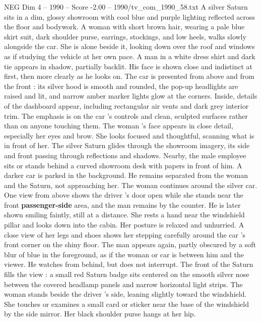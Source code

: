 \begin{textsample}{NEG Dim 4 – 1990 – Score -2.00 – 1990/tv\_com\_1990\_58.txt}  \label{ex:f4_neg_022}
A silver Saturn sits in a dim, glossy showroom with cool blue and purple lighting reflected across the floor and bodywork.
A woman with short brown hair, wearing a pale blue skirt suit, dark shoulder purse, earrings, stockings, and low heels, walks slowly alongside the car.
She is alone beside it, looking down over the roof and windows as if studying the vehicle at her own pace.
A man in a white dress shirt and dark tie appears in shadow, partially backlit.
His face is shown close and indistinct at first, then more clearly as he looks on.
The car is presented from above and from the front : its silver hood is smooth and rounded, the pop-up headlights are raised and lit, and narrow amber marker lights glow at the corners.
Inside, details of the dashboard appear, including rectangular air vents and dark grey interior trim.
The emphasis is on the car ’s controls and clean, sculpted surfaces rather than on anyone touching them.
The woman ’s face appears in close detail, especially her eyes and brow.
She looks focused and thoughtful, scanning what is in front of her.
The silver Saturn glides through the showroom imagery, its side and front passing through reflections and shadows.
Nearby, the male employee sits or stands behind a curved showroom desk with papers in front of him.
A darker car is parked in the background.
He remains separated from the woman and the Saturn, not approaching her.
The woman continues around the silver car.
One view from above shows the driver ’s door open while she stands near the front \textbf{passenger-side} area, and the man remains by the counter.
He is later shown smiling faintly, still at a distance.
She rests a hand near the windshield pillar and looks down into the cabin.
Her posture is relaxed and unhurried.
A close view of her legs and shoes shows her stepping carefully around the car ’s front corner on the shiny floor.
The man appears again, partly obscured by a soft blur of blue in the foreground, as if the woman or car is between him and the viewer.
He watches from behind, but does not interrupt.
The front of the Saturn fills the view : a small red Saturn badge sits centered on the smooth silver nose between the covered headlamp panels and narrow horizontal light strips.
The woman stands beside the driver ’s side, leaning slightly toward the windshield.
She touches or examines a small card or sticker near the base of the windshield by the side mirror.
Her black shoulder purse hangs at her hip.

\end{textsample}
